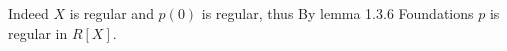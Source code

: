 Indeed $X$ is regular and $p(0)$ is regular, thus By lemma 1.3.6 Foundations \todocite $p$ is regular in $R[X]$. \\

